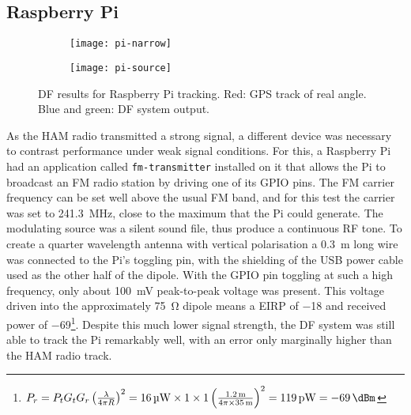 \subsection{Raspberry Pi}
\begin{figure}
  \centering
  \begin{subfigure}[b]{0.77\textwidth}
    \centering
    \texttt{[image: pi-narrow]}
  \end{subfigure}
  \begin{subfigure}[b]{0.22\textwidth}
    \centering
    \texttt{[image: pi-source]}
    \vspace{2em}
  \end{subfigure}
  \caption{DF results for Raspberry Pi tracking. Red: GPS track of real angle. Blue and green: DF system output.}
  \label{fig:field-trials:pi-source}
\end{figure}
As the HAM radio transmitted a strong signal, a different device was necessary to contrast performance under weak signal conditions. For this, a Raspberry Pi had an application called \lstinline{fm-transmitter} installed on it that allows the Pi to broadcast an FM radio station by driving one of its GPIO pins. The FM carrier frequency can be set well above the usual FM band, and for this test the carrier was set to \SI{241.3}{\mega\hertz}, close to the maximum that the Pi could generate. The modulating source was a silent sound file, thus produce a continuous RF tone. To create a quarter wavelength antenna with vertical polarisation a \SI{0.3}{\metre} long wire was connected to the Pi's toggling pin, with the shielding of the USB power cable used as the other half of the dipole.
With the GPIO pin toggling at such a high frequency, only about \SI{100}{\milli\volt} peak-to-peak voltage was present. This voltage driven into the approximately \SI{75}{\ohm} dipole means a EIRP of \SI{-18}{\dBm} and received power of \SI{-69}{\dBm}\footnote{\(P_r = P_t G_t G_r \left( \frac{\lambda}{4 \pi R} \right)^2 = \SI{16}{\micro\watt} \times 1 \times 1 \left( \frac{\SI{1.2}{\meter}}{4 \pi \times \SI{35}{\meter}} \right)^2 = \SI{119}{\pico\watt} = \SI{-69}{\dBm}\)}. Despite this much lower signal strength, the DF system was still able to track the Pi remarkably well, with an error only marginally higher than the HAM radio track.\\


